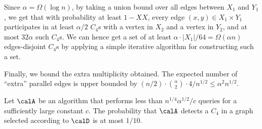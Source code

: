 Since $\alpha = \Omega(\log n)$, by taking a union bound over all edges between $X_1$ and $Y_1$, we get that
with probability at least $1-XX$, every edge $(x,y)\in X_1\times Y_1$ participates in at least $\alpha/2$ $C_4$s with a vertex in $X_2$ and a vertex in $Y_2$, and at most $32\alpha$ such $C_4$s. We can hence get a set of at least $\alpha\cdot |X_1|/64 = \Omega(\alpha n)$ edges-disjoint $C_4$s by applying a simple iterative algorithm for constructing such a set. 

Finally, we  bound the extra multiplicity obtained.
The expected number of ``extra'' parallel edges is upper bounded by
$(n/2)\cdot {\alpha\choose 2} \cdot 4/ n^{1/2} \leq \alpha^2 n^{1/2}$. 
\fi

\begin{lemma}\label{lem:D-C4-lb}
Let $\calA$ be an algorithm  that performs less than $n^{1/4}\alpha^{1/2}/c$ queries for a sufficiently large constant $c$. The probability that $\calA$ detects a $C_4$ in a graph selected according to $\calD$
is at most $1/10$.
\end{lemma}


